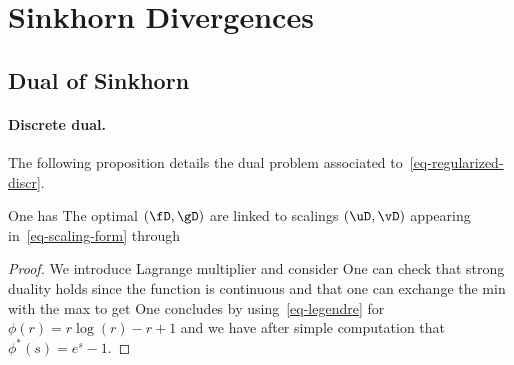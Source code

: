 
\section{Sinkhorn Divergences}

\subsection{Dual of Sinkhorn}

\paragraph{Discrete dual.}

The following proposition details the dual problem associated to~\eqref{eq-regularized-discr}.

\begin{prop}
One has
%
The optimal $(\fD,\gD)$ are linked to scalings $(\uD,\vD)$ appearing in~\eqref{eq-scaling-form} through 
\end{prop}

\begin{proof}
We introduce Lagrange multiplier and consider
One can check that strong duality holds since the function is continuous and that one can exchange the min with the max to get
One concludes by using~\eqref{eq-legendre} for $\phi(r)=r \log(r)-r+1$
and we have after simple computation that $\phi^*(s)=e^s-1$.
\end{proof}

